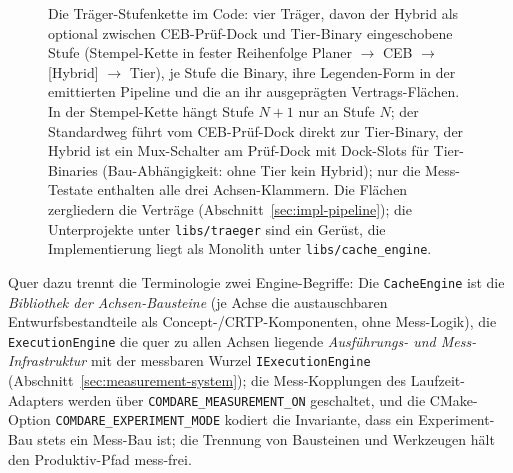 \begin{nurkurz}
\begin{figure}[htbp]
\caption[Die Träger-Stufenkette im Code]{Die Träger-Stufenkette im Code: vier Träger, davon der Hybrid als optional
zwischen CEB-Prüf-Dock und Tier-Binary eingeschobene Stufe (Stempel-Kette in fester Reihenfolge Planer $\to$ CEB
$\to$ [Hybrid] $\to$ Tier), je Stufe die Binary, ihre Legenden-Form in der emittierten Pipeline und die an ihr
ausgeprägten Vertrags-Flächen. In der Stempel-Kette hängt Stufe $N+1$ nur an Stufe $N$; der Standardweg führt vom
CEB-Prüf-Dock direkt zur Tier-Binary, der Hybrid ist ein Mux-Schalter am Prüf-Dock mit Dock-Slots für Tier-Binaries
(Bau-Abhängigkeit: ohne Tier kein Hybrid); nur die Mess-Testate enthalten alle drei Achsen-Klammern. Die Flächen
zergliedern die Verträge (Abschnitt~\ref{sec:impl-pipeline}); die Unterprojekte unter \texttt{libs/traeger}
sind ein Gerüst, die Implementierung liegt als Monolith unter \texttt{libs/cache\_engine}.}\label{fig:traeger-stufen}
\end{figure}
Quer dazu trennt die Terminologie zwei Engine-Begriffe: Die \texttt{CacheEngine} ist die \emph{Bibliothek
der Achsen-Bausteine} (je Achse die austauschbaren Entwurfsbestandteile als Concept-/CRTP-Komponenten, ohne
Mess-Logik), die \texttt{ExecutionEngine} die quer zu allen Achsen liegende \emph{Ausführungs- und
Mess-Infrastruktur} mit der messbaren Wurzel \texttt{IExecutionEngine}
(Abschnitt~\ref{sec:measurement-system}); die Mess-Kopplungen des Laufzeit-Adapters werden über
\texttt{COMDARE\_\allowbreak{}MEASUREMENT\_\allowbreak{}ON} geschaltet, und die CMake-Option
\texttt{COMDARE\_\allowbreak{}EXPERIMENT\_\allowbreak{}MODE} kodiert die Invariante, dass ein Experiment-Bau
stets ein Mess-Bau ist; die Trennung von Bausteinen und Werkzeugen hält den Produktiv-Pfad mess-frei.


\end{nurkurz}
